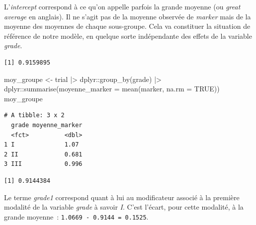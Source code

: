 \documentclass[
  letterpaper,
  DIV=11,
  numbers=noendperiod,
  oneside]{scrreprt}
\newenvironment{Shaded}{\begin{snugshade}}{\end{snugshade}}
\newcommand{\AttributeTok}[1]{\textcolor[rgb]{0.40,0.45,0.13}{#1}}
\newcommand{\ConstantTok}[1]{\textcolor[rgb]{0.56,0.35,0.01}{#1}}
\newcommand{\FunctionTok}[1]{\textcolor[rgb]{0.28,0.35,0.67}{#1}}
\newcommand{\NormalTok}[1]{\textcolor[rgb]{0.00,0.23,0.31}{#1}}
\newcommand{\OtherTok}[1]{\textcolor[rgb]{0.00,0.23,0.31}{#1}}
\newcommand{\SpecialCharTok}[1]{\textcolor[rgb]{0.37,0.37,0.37}{#1}}
\begin{document}
L'\emph{intercept} correspond à ce qu'on appelle parfois la grande
moyenne (ou \emph{great average} en anglais). Il ne s'agit pas de la
moyenne observée de \emph{marker} mais de la moyenne des moyennes de
chaque sous-groupe. Cela va constituer la situation de référence de
notre modèle, en quelque sorte indépendante des effets de la variable
\emph{grade}.

\begin{Shaded}
\end{Shaded}

\begin{verbatim}
[1] 0.9159895
\end{verbatim}

\begin{Shaded}
\begin{Highlighting}[]
\NormalTok{moy\_groupe }\OtherTok{\textless{}{-}}
\NormalTok{  trial }\SpecialCharTok{|\textgreater{}} 
\NormalTok{  dplyr}\SpecialCharTok{::}\FunctionTok{group\_by}\NormalTok{(grade) }\SpecialCharTok{|\textgreater{}} 
\NormalTok{  dplyr}\SpecialCharTok{::}\FunctionTok{summarise}\NormalTok{(}\AttributeTok{moyenne\_marker =} \FunctionTok{mean}\NormalTok{(marker, }\AttributeTok{na.rm =} \ConstantTok{TRUE}\NormalTok{))}
\NormalTok{moy\_groupe}
\end{Highlighting}
\end{Shaded}

\begin{verbatim}
# A tibble: 3 x 2
  grade moyenne_marker
  <fct>          <dbl>
1 I              1.07 
2 II             0.681
3 III            0.996
\end{verbatim}

\begin{Shaded}
\end{Shaded}

\begin{verbatim}
[1] 0.9144384
\end{verbatim}

Le terme \emph{grade1} correspond quant à lui au modificateur associé à
la première modalité de la variable \emph{grade} à savoir \emph{I}.
C'est l'écart, pour cette modalité, à la grande moyenne~:
\texttt{1.0669\ -\ 0.9144\ =\ 0.1525}.
\end{document}
